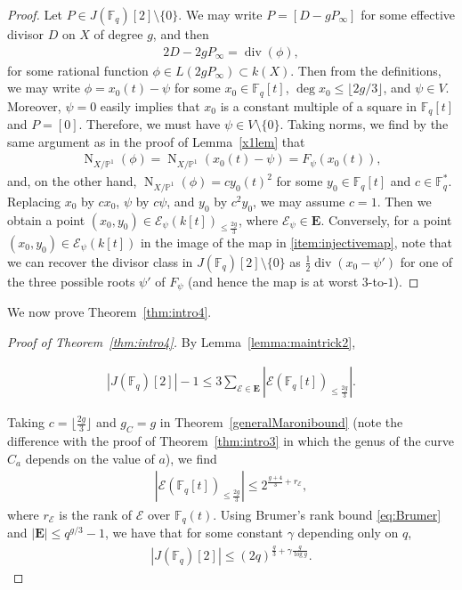 \documentclass[11pt]{article}
\theoremstyle{plain}
\theoremstyle{definition}
\DeclareMathOperator{\divisor}{div}
\DeclareMathOperator{\Norm}{N}
\newcommand{\PP}{\mathbb{P}}
\newcommand{\E}{\mathcal{E}}
\begin{document}
\begin{proof}
Let $P\in J(\mathbb{F}_q)[2]\setminus\{0\}$. We may write $P=[D-gP_\infty]$ for some effective divisor $D$ on $X$ of degree $g$, and then
\begin{align*}
2D-2gP_\infty=\divisor(\phi),
\end{align*}
for some rational function $\phi\in L(2gP_\infty)\subset k(X)$. Then from the definitions, we may write $\phi=x_0(t)-\psi$ for some  $x_0\in \mathbb{F}_q[t]$, $\deg x_0\leq \lfloor 2g/3\rfloor$, and $\psi\in V$. Moreover, $\psi=0$ easily implies that $x_0$ is a constant multiple of a square in $\mathbb{F}_q[t]$ and $P=[0]$. Therefore, we must have $\psi\in V\setminus\{0\}$. Taking norms, we find by the same argument as in the proof of Lemma~\ref{x1lem} that
\begin{align*}
\Norm_{X/\PP^1}(\phi)=\Norm_{X/\PP^1}(x_0(t)-\psi)=F_\psi(x_0(t)),
\end{align*}
and, on the other hand, $\Norm_{X/\PP^1}(\phi)= cy_0(t)^2$ 
for some $y_0\in \mathbb{F}_q[t]$ and $c\in \mathbb{F}_q^*$. Replacing $x_0$ by $cx_0$, $\psi$ by $c\psi$, and $y_0$ by $c^2y_0$, we may assume $c=1$. Then we obtain a point $(x_0,y_0)\in \E_\psi(k[t])_{\leq \frac{2g}{3}}$, where $\E_\psi\in \mathbf{E}$. Conversely, for a point $(x_0,y_0)\in \E_\psi(k[t])$ in the image of the map in \eqref{item:injectivemap}, note that we can recover the divisor class in $J(\mathbb{F}_q)[2]\setminus\{0\}$ as $\frac{1}{2}\divisor(x_0-\psi')$ for one of the three possible roots $\psi'$ of $F_\psi$ (and hence the map is at worst $3$-to-$1$).
\end{proof}

We now prove Theorem~\ref{thm:intro4}.


\begin{proof}[Proof of Theorem~\ref{thm:intro4}]
By Lemma~\ref{lemma:maintrick2},

\begin{align*}
|J(\mathbb{F}_q)[2]|-1\leq 3\sum_{\E\in \mathbf{E}}\left|\E(\mathbb{F}_q[t])_{\leq \frac{2g}{3}}\right|.
\end{align*} 

Taking $c=\lfloor\frac{2g}{3}\rfloor$ and $g_C=g$ in Theorem~\ref{generalMaronibound} (note the difference with the proof of Theorem~\ref{thm:intro3} in which the genus of the curve $C_a$ depends on the value of $a$), we find
\begin{align*}
\left|\E(\mathbb{F}_q[t])_{\leq \frac{2g}{3}}\right|\leq 2^{\frac{g+4}{3}+r_\E},
\end{align*} 
where $r_\E$ is the rank of $\E$ over $\mathbb{F}_q(t)$. Using Brumer's rank bound \eqref{eq:Brumer} and $|\mathbf{E}|\leq q^{g/3}-1$, we have that for some constant $\gamma$ depending only on $q$, 
\begin{align*}
|J(\mathbb{F}_q)[2]|\leq (2q)^{\frac{g}{3}+\gamma \frac{g}{\log g}}.
\end{align*} 
\end{proof}
\end{document}
